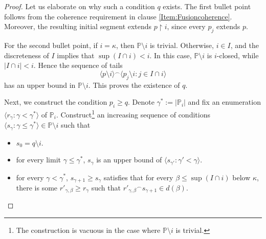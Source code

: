 \documentclass{article}
\theoremstyle{definition}
\theoremstyle{plain}
\newcommand{\po}{\mathbb{P}}
\newcommand{\la}{\langle}
\newcommand{\ra}{\rangle}
\newcommand{\uhr}{\upharpoonright}
\begin{document}
\begin{proof}
    Let us elaborate on why such a condition $q$ exists. The first bullet point follows from the coherence requirement in clause \ref{Item:Fusioncoherence}. Moreover, the resulting initial segment extends $p\uhr i$, since every $p_j$ extends $p$. 

    For the second bullet point, if $i=\kappa$, then $\po\setminus i$ is trivial. Otherwise, $i\in I$, and the discreteness of $I$ implies that
    $\sup(I\cap i)<i$. In this case, $\po\setminus i$ is $i$-closed, while
    $|I\cap i|<i$. Hence the sequence of tails
    $$ \la p\setminus i\ra{}^\frown \la p_j\setminus i\colon j\in I\cap i\ra$$
    has an upper bound in $\po\setminus i$. This proves the existence of $q$.
    
    Next, we construct the condition $p_i \geq q$. Denote $\gamma^*:= |\po_{i}|$ and fix an enumeration $\la r_\gamma\colon \gamma<\gamma^* \ra$ of $\po_{i}$. Construct\footnote{The construction is vacuous in the case where $\po\setminus i$ is trivial.} an increasing sequence of conditions $\la s_
    \gamma\colon \gamma\leq\gamma^* \ra \in \po\setminus i$ such that
    \begin{itemize}
        \item $s_0 = q\setminus i$.
        \item for every limit $\gamma\leq \gamma^*$, $s_\gamma$ is an upper bound of $\la s_{\gamma'}\colon \gamma'<\gamma \ra$.
        \item for every $\gamma<\gamma^*$, $s_{\gamma+1}\geq s_\gamma$ satisfies that for every $\beta\leq\sup(I\cap i)$ below $\kappa$, there is some $r'_{\gamma,\beta}\geq r_\gamma$ such that $r'_{\gamma,\beta}{}^\frown s_{\gamma+1} \in d(\beta)$.
    \end{itemize}
    

\end{proof}
\end{document}
